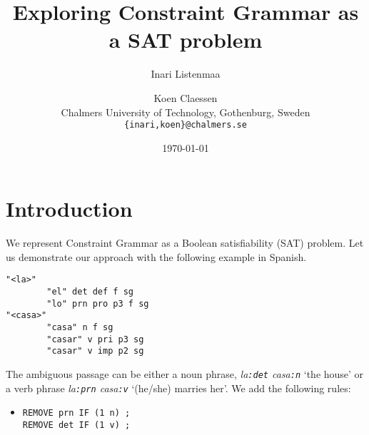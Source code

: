 \documentclass[11pt]{article}
\title{Exploring Constraint Grammar as a SAT problem}
\author{Inari Listenmaa \and Koen Claessen \\
  Chalmers University of Technology, Gothenburg, Sweden \\
  {\tt \{inari,koen\}@chalmers.se} }
\date{\today}
\begin{document}
\maketitle



\section{Introduction}

We represent Constraint Grammar \cite{karlsson1995constraint} 
as a Boolean satisfiability (SAT) problem.
Let us demonstrate our approach with the following example in Spanish.

\begin{verbatim}
"<la>"
        "el" det def f sg
        "lo" prn pro p3 f sg
"<casa>"
        "casa" n f sg
        "casar" v pri p3 sg
        "casar" v imp p2 sg
\end{verbatim}

The ambiguous passage can be either a noun phrase, \emph{la\texttt{:det} casa\texttt{:n}} 
`the house'  or a verb phrase \emph{la\texttt{:prn} casa\texttt{:v}} `(he/she) marries her'. 
We add the following rules:

\begin{itemize}
\item [] \texttt{REMOVE prn IF (1 n) ;} \\
             \texttt{REMOVE det IF (1 v) ;}
\end{itemize}
\end{document}
